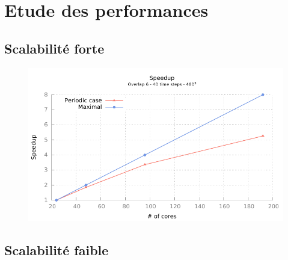 \documentclass{beamer}
\begin{document}
%
%

\section{Etude des performances}
\subsection{Scalabilité forte}
\begin{frame}
  \begin{figure}[ht]
    \centering
    \includegraphics[page=2,scale=0.8]{gnuplot/bench_strong_nemo.pdf}
    \caption{\label{fig:label} }
  \end{figure}

\end{frame}


\subsection{Scalabilité faible}
\begin{frame}
  
\end{frame}

%
%

\begin{frame}
  
\end{frame}
\end{document}
